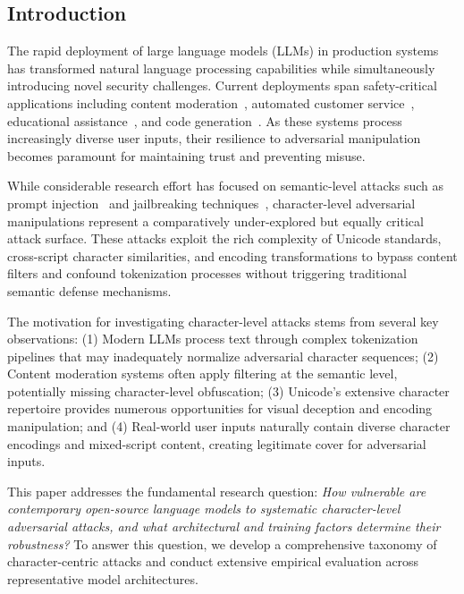 \documentclass[11pt]{article}
\begin{document}
\begin{multicols}{2}

\section{Introduction}

The rapid deployment of large language models (LLMs) in production systems has transformed natural language processing capabilities while simultaneously introducing novel security challenges. Current deployments span safety-critical applications including content moderation~\citep{jiang2023evaluating}, automated customer service~\citep{brown2020language}, educational assistance~\citep{kasneci2023chatgpt}, and code generation~\citep{chen2021evaluating}. As these systems process increasingly diverse user inputs, their resilience to adversarial manipulation becomes paramount for maintaining trust and preventing misuse.

While considerable research effort has focused on semantic-level attacks such as prompt injection~\citep{greshake2023not} and jailbreaking techniques~\citep{wei2023jailbroken,zou2023universal}, character-level adversarial manipulations represent a comparatively under-explored but equally critical attack surface. These attacks exploit the rich complexity of Unicode standards, cross-script character similarities, and encoding transformations to bypass content filters and confound tokenization processes without triggering traditional semantic defense mechanisms.

The motivation for investigating character-level attacks stems from several key observations: (1) Modern LLMs process text through complex tokenization pipelines that may inadequately normalize adversarial character sequences; (2) Content moderation systems often apply filtering at the semantic level, potentially missing character-level obfuscation; (3) Unicode's extensive character repertoire provides numerous opportunities for visual deception and encoding manipulation; and (4) Real-world user inputs naturally contain diverse character encodings and mixed-script content, creating legitimate cover for adversarial inputs.

This paper addresses the fundamental research question: \emph{How vulnerable are contemporary open-source language models to systematic character-level adversarial attacks, and what architectural and training factors determine their robustness?} To answer this question, we develop a comprehensive taxonomy of character-centric attacks and conduct extensive empirical evaluation across representative model architectures.


\end{multicols}
\end{document}
